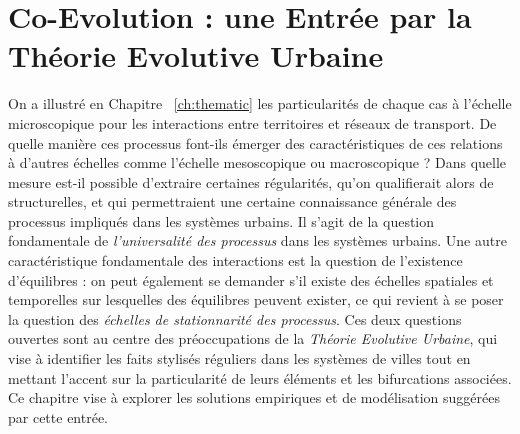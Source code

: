 



\chapter[Théorie Evolutive Urbaine]{Co-Evolution : une Entrée par la Théorie Evolutive Urbaine}

\label{ch:evolutiveurban} %










On a illustré en Chapitre ~\ref{ch:thematic} les particularités de chaque cas à l'échelle microscopique pour les interactions entre territoires et réseaux de transport. De quelle manière ces processus font-ils émerger des caractéristiques de ces relations à d'autres échelles comme l'échelle mesoscopique ou macroscopique ? Dans quelle mesure est-il possible d'extraire certaines régularités, qu'on qualifierait alors de structurelles, et qui permettraient une certaine connaissance générale des processus impliqués dans les systèmes urbains. Il s'agit de la question fondamentale de \emph{l'universalité des processus}  
dans les systèmes urbains. Une autre caractéristique fondamentale des interactions est la question de l'existence d'équilibres : on peut également se demander s'il existe des échelles spatiales et temporelles sur lesquelles des équilibres peuvent exister, ce qui revient à se poser la question des \emph{échelles de stationnarité des processus}. Ces deux questions ouvertes sont au centre des préoccupations de la \emph{Théorie Evolutive Urbaine}, qui vise à identifier les faits stylisés réguliers dans les systèmes de villes tout en mettant l'accent sur la particularité de leurs éléments et les bifurcations associées. Ce chapitre vise à explorer les solutions empiriques et de modélisation suggérées par cette entrée.


